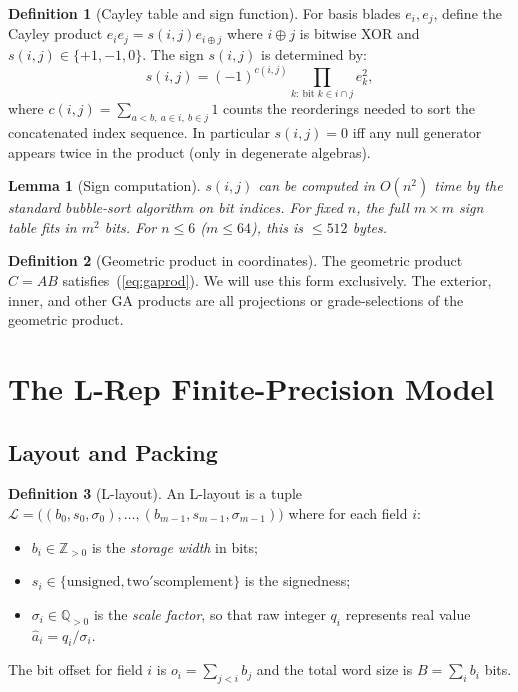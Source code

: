 \documentclass[11pt,a4paper]{article}
\theoremstyle{definition}
\newtheorem{definition}{Definition}[section]
\theoremstyle{plain}
\newtheorem{lemma}{Lemma}[section]
\theoremstyle{remark}
\begin{document}
\begin{definition}[Cayley table and sign function]
\label{def:cayley}
For basis blades $e_i, e_j$, define the Cayley product $e_i e_j = s(i,j) e_{i \oplus j}$ where $i\oplus j$ is bitwise XOR and $s(i,j)\in\{+1,-1,0\}$.  The sign $s(i,j)$ is determined by:
\begin{equation}\label{eq:sign}
s(i,j) = (-1)^{c(i,j)} \prod_{k:\ \text{bit }k \in i\cap j} e_k^2,
\end{equation}
where $c(i,j) = \sum_{a<b,\ a\in i,\ b\in j} 1$ counts the reorderings needed to sort the concatenated index sequence.  In particular $s(i,j)=0$ iff any null generator appears twice in the product (only in degenerate algebras).
\end{definition}

\begin{lemma}[Sign computation]
\label{lem:sign}
$s(i,j)$ can be computed in $O(n^2)$ time by the standard bubble-sort algorithm on bit indices.  For fixed $n$, the full $m\times m$ sign table fits in $m^2$ bits.  For $n\le 6$ ($m\le 64$), this is $\le 512$ bytes.
\end{lemma}

\begin{definition}[Geometric product in coordinates]
The geometric product $C = AB$ satisfies~(\ref{eq:gaprod}).  We will use this form exclusively.  The exterior, inner, and other GA products are all projections or grade-selections of the geometric product.
\end{definition}

\section{The L-Rep Finite-Precision Model}
\label{sec:model}

\subsection{Layout and Packing}

\begin{definition}[L-layout]
\label{def:layout}
An L-layout is a tuple $\mathcal{L} = \big((b_0,s_0,\sigma_0),\ldots,(b_{m-1},s_{m-1},\sigma_{m-1})\big)$ where for each field $i$:
\begin{itemize}
  \item $b_i \in \mathbb{Z}_{>0}$ is the \emph{storage width} in bits;
  \item $s_i \in \{\mathrm{unsigned}, \mathrm{two'scomplement}\}$ is the signedness;
  \item $\sigma_i \in \mathbb{Q}_{>0}$ is the \emph{scale factor}, so that raw integer $q_i$ represents real value $\hat{a}_i = q_i / \sigma_i$.
\end{itemize}
The bit offset for field $i$ is $o_i = \sum_{j<i} b_j$ and the total word size is $B = \sum_i b_i$ bits.
\end{definition}
\end{document}
